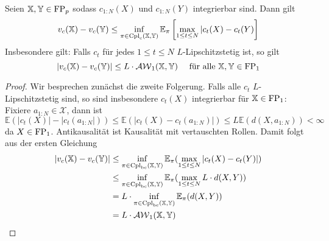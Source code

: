 \begin{corollary}
    Seien $\mathbb{X,Y} \in \operatorname{FP}_p$ sodass $c_{1:N}(X)$ und $c_{1:N}(Y)$ integrierbar sind. Dann gilt
    $$v_c(\mathbb{X}) - v_c(\mathbb{Y}) \leq \inf_{\pi \in \operatorname{Cpl}_{\operatorname{c}}(\mathbb{X,Y})} \mathbb{E}_\pi \left[\max_{1\leq t\leq N} |c_t(X) - c_t(Y)\right] $$
    Insbesondere gilt: Falls $c_t$ für jedes $1\leq t \leq N$ $L$-Lipschitzstetig ist, so gilt 
    $$|v_c(\mathbb{X}) - v_c(\mathbb{Y})| \leq L \cdot \mathcal{AW}_1(\mathbb{X,Y}) \quad \text{ für alle } \mathbb{X,Y} \in \operatorname{FP}_1$$
\end{corollary}
\begin{proof}
Wir besprechen zunächst die zweite Folgerung. Falls alle $c_t$ $L$-Lipschitzstetig sind, so sind insbesondere $c_t(X)$ integrierbar für $\mathbb{X} \in \operatorname{FP}_1$: Fixiere $a_{1:N} \in \mathcal{X}$, dann ist 
$$\mathbb{E}(|c_t(X)| - |c_t(a_{1:N}|)) \leq \mathbb{E}(|c_t(X) - c_t(a_{1:N})|) \leq L \mathbb{E}(d(X, a_{1:N})) < \infty$$
da $X \in \operatorname{FP}_1$. Antikausalität ist Kausalität mit vertauschten Rollen. Damit folgt aus der ersten Gleichung 
\begin{align*}
    |v_c(\mathbb{X}) - v_c(\mathbb{Y}) | &\leq \inf_{\pi \in \operatorname{Cpl}_{\operatorname{bc}}(\mathbb{X,Y})} \mathbb{E}_\pi(\max_{1\leq t\leq N}|c_t(X) - c_t(Y)|) \\
    &\leq \inf_{\pi \in \operatorname{Cpl}_{\operatorname{bc}}(\mathbb{X,Y})} \mathbb{E}_\pi(\max_{1\leq t\leq N}L\cdot d(X,Y)) \\
    &= L \cdot \inf_{\pi \in \operatorname{Cpl}_{\operatorname{bc}}(\mathbb{X,Y})} \mathbb{E}_\pi(d(X,Y)) \\
    &= L\cdot \mathcal{AW}_1(\mathbb{X,Y})
\end{align*}
 

\end{proof}
